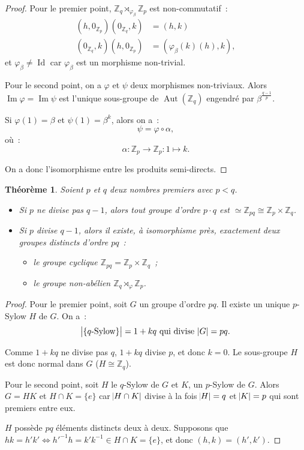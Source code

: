 \documentclass{article}
\newtheorem{thm}{Théorème}[section]
\theoremstyle{definition}
\theoremstyle{remark}
\DeclareMathOperator{\Id}{Id}
\DeclareMathOperator{\Imf}{Im}
\DeclareMathOperator{\Aut}{Aut}
\newcommand{\Z}{\mathbb Z}
\newcommand{\simeqq}{\cong}
\begin{document}
		\begin{proof} Pour le premier point, $\Z_q \rtimes_{\varphi_\beta} \Z_p$ est non-commutatif~:
		\begin{align*}
			(h, 0_{\Z_p})(0_{\Z_q}, k) &= (h, k) \\
			(0_{\Z_q}, k)(h, 0_{\Z_p}) &= (\varphi_\beta(k)(h), k),
		\end{align*}
		et $\varphi_\beta \neq \Id$ car $\varphi_\beta$ est un morphisme non-trivial.

		Pour le second point, on a $\varphi$ et $\psi$ deux morphismes non-triviaux. Alors $\Imf \varphi = \Imf \psi$ est l'unique sous-groupe de $\Aut(\Z_q)$
		engendré par $\beta^{\frac {q-1}p}$.

		Si $\varphi(1) = \beta$ et $\psi(1) = \beta^k$, alors on a~:
		\[\psi = \varphi \circ \alpha,\]
		où~:
		\[\alpha : \Z_p \to \Z_p : 1 \mapsto k.\]

		On a donc l'isomorphisme entre les produits semi-directs.
		\end{proof}

		\begin{thm} Soient $p$ et $q$ deux nombres premiers avec $p < q$.
		\begin{itemize}
			\item Si $p$ ne divise pas $q-1$, alors tout groupe d'ordre $p \cdot q$ est $\simeq \Z_{pq} \simeqq \Z_p \times \Z_q$.

			\item Si $p$ divise $q-1$, alors il existe, à isomorphisme près, exactement deux groupes distincts d'ordre $pq$~:
			\begin{itemize}
				\item le groupe cyclique $\Z_{pq} = \Z_p \times \Z_q$~;
				\item le groupe non-abélien $\Z_q \rtimes_\varphi \Z_p$.
			\end{itemize}
		\end{itemize}
		\end{thm}

		\begin{proof} Pour le premier point, soit $G$ un groupe d'ordre $pq$. Il existe un unique $p$-Sylow $H$ de $G$. On a~:
		\[\abs {\{q\text{-Sylow}\}} = 1 + kq \text { qui divise } \abs G = pq.\]

		Comme $1+kq$ ne divise pas $q$, $1 + kq$ divise $p$, et donc $k = 0$. Le sous-groupe $H$ est donc normal dans $G$ ($H \simeqq \Z_q$).

		Pour le second point, soit $H$ le $q$-Sylow de $G$ et $K$, un $p$-Sylow de $G$. Alors $G = HK$ et $H \cap K = \{e\}$ car $\abs {H \cap K}$ divise à la
		fois $\abs H = q$ et $\abs K = p$ qui sont premiers entre eux.

		$H$ possède $pq$ éléments distincts deux à deux. Supposons que $hk = h'k' \iff h'^{-1}h = k'k^{-1} \in H \cap K = \{e\}$, et donc $(h, k) = (h', k')$.
		\end{proof}
\end{document}
